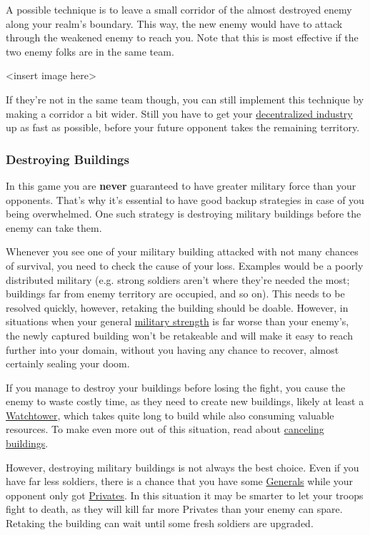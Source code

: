 \documentclass[12pt]{article}
\begin{document}
A possible technique is to leave a small corridor of the almost destroyed enemy along your realm's boundary. This way, the new enemy would have to attack through the weakened enemy to reach you. Note that this is most effective if the two enemy folks are in the same team.

<insert image here>

If they're not in the same team though, you can still implement this technique by making a corridor a bit wider. Still you have to get your \hyperref[sec:decentralization]{decentralized industry} up as fast as possible, before your future opponent takes the remaining territory.

\subsubsection{Destroying Buildings}
\label{sec:destroyingbuildings}

In this game you are \textbf{never} guaranteed to have greater military force than your opponents. That's why it's essential to have good backup strategies in case of you being overwhelmed. One such strategy is destroying military buildings before the enemy can take them.

Whenever you see one of your military building attacked with not many chances of survival, you need to check the cause of your loss. Examples would be a poorly distributed military (e.g. strong soldiers aren't where they're needed the most; buildings far from enemy territory are occupied, and so on). This needs to be resolved quickly, however, retaking the building should be doable. However, in situations when your general \hyperref[sec:statisticsmilitary]{military strength} is far worse than your enemy's, the newly captured building won't be retakeable and will make it easy to reach further into your domain, without you having any chance to recover, almost certainly sealing your doom.

\label{wastingenemyresourcesbydestroyingbuildings}
If you manage to destroy your buildings before losing the fight, you cause the enemy to waste costly time, as they need to create new buildings, likely at least a \hyperref[sec:watchtower]{Watchtower}, which takes quite long to build while also consuming valuable resources. To make even more out of this situation, read about \hyperref[sec:buildingcanceling]{canceling buildings}.

However, destroying military buildings is not always the best choice. Even if you have far less soldiers, there is a chance that you have some \hyperref[sec:general]{Generals} while your opponent only got \hyperref[sec:private]{Privates}. In this situation it may be smarter to let your troops fight to death, as they will kill far more Privates than your enemy can spare. Retaking the building can wait until some fresh soldiers are upgraded.
\end{document}

